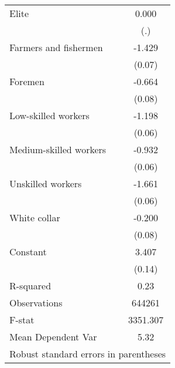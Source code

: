 {\begin{tabular}{l*{1}{c}}
Elite               &       0.000         \\
                    &         (.)         \\
Farmers and fishermen&      -1.429\sym{***}\\
                    &      (0.07)         \\
Foremen             &      -0.664\sym{***}\\
                    &      (0.08)         \\
Low-skilled workers &      -1.198\sym{***}\\
                    &      (0.06)         \\
Medium-skilled workers&      -0.932\sym{***}\\
                    &      (0.06)         \\
Unskilled workers   &      -1.661\sym{***}\\
                    &      (0.06)         \\
White collar        &      -0.200\sym{*}  \\
                    &      (0.08)         \\
Constant            &       3.407\sym{***}\\
                    &      (0.14)         \\
\hline
R-squared           &        0.23         \\
Observations        &      644261         \\
F-stat              &    3351.307         \\
Mean Dependent Var  &        5.32         \\
\hline\hline
\multicolumn{2}{l}{\footnotesize Robust standard errors in parentheses}\\
\end{tabular}
}
